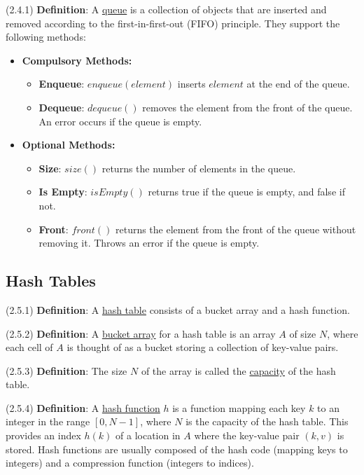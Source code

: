 \documentclass{article}
\newcommand{\separate}[1] {\vspace{#1 pt}\noindent}
\newcommand{\definition}[2]{(#1) \textbf{Definition}: #2}
\begin{document}
\definition{2.4.1}{A \underline{queue} is a collection of objects that are inserted and removed according to the first-in-first-out (FIFO) principle.} They support the following methods:
\begin{itemize}
    \item \textbf{Compulsory Methods:}
    \begin{itemize}
        \item \textbf{Enqueue}: \(enqueue(element)\) inserts \(element\) at the end of the queue.
        \item \textbf{Dequeue}: \(dequeue()\) removes the element from the front of the queue. An error occurs if the queue is empty.
    \end{itemize}
    \item \textbf{Optional Methods:}
    \begin{itemize}
        \item \textbf{Size}: \(size()\) returns the number of elements in the queue.
        \item \textbf{Is Empty}: \(isEmpty()\) returns true if the queue is empty, and false if not.
        \item \textbf{Front}: \(front()\) returns the element from the front of the queue without removing it. Throws an error if the queue is empty.
    \end{itemize}
\end{itemize}

\subsection{Hash Tables}

\definition{2.5.1}{A \underline{hash table} consists of a bucket array and a hash function.}

\separate{5}\definition{2.5.2}{A \underline{bucket array} for a hash table is an array \(A\) of size \(N\), where each cell of \(A\) is thought of as a bucket storing a collection of key-value pairs.} 

\separate{5}\definition{2.5.3}{The size \(N\) of the array is called the \underline{capacity} of the hash table.}

\separate{5}\definition{2.5.4}{A \underline{hash function} \(h\) is a function mapping each key \(k\) to an integer in the range \([0,N-1]\), where \(N\) is the capacity of the hash table. This provides an index \(h(k)\) of a location in \(A\) where the key-value pair \((k,v)\) is stored. Hash functions are usually composed of the hash code (mapping keys to integers) and a compression function (integers to indices).}
\end{document}
